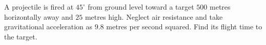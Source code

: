 A projectile is fired at $45^\circ$ from ground level toward a target $500$ metres horizontally away and $25$ metres high. Neglect air resistance and take gravitational acceleration as $9.8$ metres per second squared. Find its flight time to the target.
